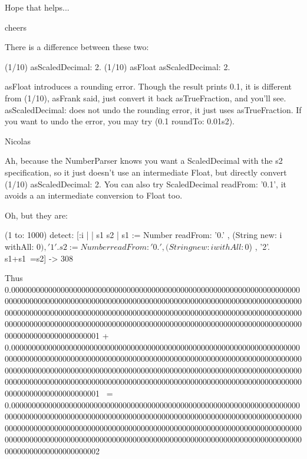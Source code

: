 \documentclass[a4paper,10pt,twoside]{book}
\begin{document}
Hope that helps...

cheers

There is a difference between these two:

(1/10) asScaledDecimal: 2.
(1/10) asFloat asScaledDecimal: 2.

asFloat introduces a rounding error.
Though the result prints 0.1, it is different from (1/10), asFrank
said, just convert it back asTrueFraction, and you'll see.
asScaledDecimal: does not undo the rounding error, it just uses asTrueFraction.
If you want to undo the error, you may try (0.1 roundTo: 0.01s2).

Nicolas



Ah, because the NumberParser knows you want a ScaledDecimal with the
s2 specification, so it just doesn't use an intermediate Float, but
directly convert (1/10) asScaledDecimal: 2.
You can also try ScaledDecimal readFrom: '0.1', it avoids a an
intermediate conversion to Float too.


Oh, but they are:

(1 to: 1000) detect: [:i |
	| s1 s2 |
	s1 := Number readFrom: '0.' , (String new: i withAll: $0) , '1'.
	s2 := Number readFrom: '0.' , (String new: i withAll: $0) , '2'.
	s1+s1~=s2]
->  308

Thus 0.000000000000000000000000000000000000000000000000000000000000000000000000000000000000000000000000000000000000000000000000000000000000000000000000000000000000000000000000000000000000000000000000000000000000000000000000000000000000000000000000000000000000000000000000000000000000000000000000000000000000000000001
+ 0.000000000000000000000000000000000000000000000000000000000000000000000000000000000000000000000000000000000000000000000000000000000000000000000000000000000000000000000000000000000000000000000000000000000000000000000000000000000000000000000000000000000000000000000000000000000000000000000000000000000000000000001
~= 0.000000000000000000000000000000000000000000000000000000000000000000000000000000000000000000000000000000000000000000000000000000000000000000000000000000000000000000000000000000000000000000000000000000000000000000000000000000000000000000000000000000000000000000000000000000000000000000000000000000000000000000002


\ifx\wholebook\relax\else
   
   
\end{document}
